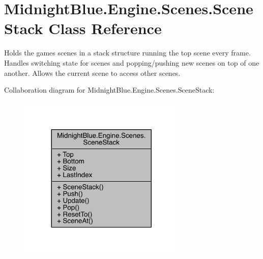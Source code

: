 \hypertarget{class_midnight_blue_1_1_engine_1_1_scenes_1_1_scene_stack}{}\section{Midnight\+Blue.\+Engine.\+Scenes.\+Scene\+Stack Class Reference}
\label{class_midnight_blue_1_1_engine_1_1_scenes_1_1_scene_stack}


Holds the games scenes in a stack structure running the top scene every frame. Handles switching state for scenes and popping/pushing new scenes on top of one another. Allows the current scene to access other scenes.  




Collaboration diagram for Midnight\+Blue.\+Engine.\+Scenes.\+Scene\+Stack\+:
\nopagebreak
\begin{figure}[H]
\begin{center}
\leavevmode
\includegraphics[width=227pt]{class_midnight_blue_1_1_engine_1_1_scenes_1_1_scene_stack__coll__graph}
\end{center}
\end{figure}
